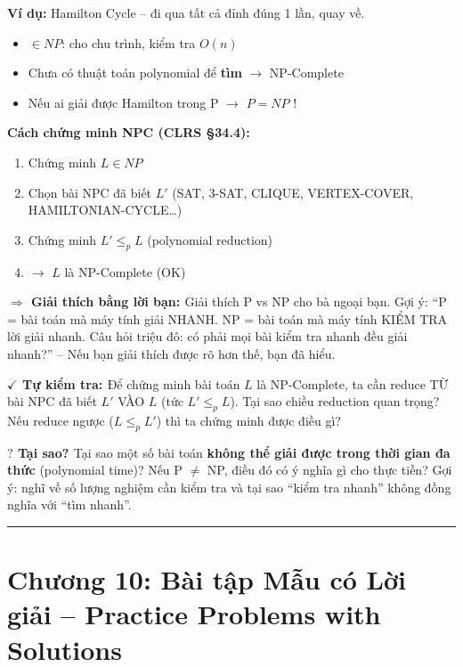 \documentclass[10pt]{article}
\newcommand{\whyprompt}[1]{%
  \begin{tcolorbox}[colback=yellow!8!white, colframe=orange!70!yellow, leftrule=3pt,
    toprule=0pt, bottomrule=0pt, rightrule=0pt,
    boxsep=2pt, left=6pt, right=6pt, top=4pt, bottom=4pt]
  {\small\textbf{\textcolor{orange!80!black}{$\boldsymbol{?}$ Tại sao? }} #1}
  \end{tcolorbox}}
\newcommand{\feynman}[1]{%
  \begin{tcolorbox}[colback=violet!5!white, colframe=violet!60!white, leftrule=3pt,
    toprule=0pt, bottomrule=0pt, rightrule=0pt,
    boxsep=2pt, left=6pt, right=6pt, top=4pt, bottom=4pt]
  {\small\textbf{\textcolor{violet!80!black}{$\Rightarrow$ Giải thích bằng lời bạn: }} #1}
  \end{tcolorbox}}
\newcommand{\checkpoint}[1]{%
  \begin{tcolorbox}[colback=orange!5!white, colframe=orange!70!black, leftrule=3pt,
    toprule=0pt, bottomrule=0pt, rightrule=0pt,
    boxsep=2pt, left=6pt, right=6pt, top=4pt, bottom=4pt]
  {\small\textbf{\textcolor{orange!80!black}{$\checkmark$ Tự kiểm tra: }} #1}
  \end{tcolorbox}}
\providecommand{\tightlist}{\setlength{\itemsep}{0pt}\setlength{\parskip}{0pt}}
\begin{document}
\textbf{Ví dụ:} Hamilton Cycle -- đi qua tất cả đỉnh đúng 1 lần, quay
về.

\begin{itemize}
\tightlist
\item
  \(\in NP\): cho chu trình, kiểm tra \(O(n)\)
\item
  Chưa có thuật toán polynomial để \textbf{tìm} \(\to\) NP-Complete
\item
  Nếu ai giải được Hamilton trong P \(\to\) \(P = NP\) !
\end{itemize}

\textbf{Cách chứng minh NPC (CLRS \S 34.4):}

\begin{enumerate}
\def\labelenumi{\arabic{enumi}.}
\tightlist
\item
  Chứng minh \(L \in NP\)
\item
  Chọn bài NPC đã biết \(L'\) (SAT, 3-SAT, CLIQUE, VERTEX-COVER,
  HAMILTONIAN-CYCLE\ldots)
\item
  Chứng minh \(L' \leq_p L\) (polynomial reduction)
\item
  \(\to\) \(L\) là NP-Complete (OK)
\end{enumerate}

\feynman{Giải thích P vs NP cho bà ngoại bạn. Gợi ý: ``P = bài toán mà máy tính giải NHANH. NP = bài toán mà máy tính KIỂM TRA lời giải nhanh. Câu hỏi triệu đô: có phải mọi bài kiểm tra nhanh đều giải nhanh?'' -- Nếu bạn giải thích được rõ hơn thế, bạn đã hiểu.}

\checkpoint{Để chứng minh bài toán $L$ là NP-Complete, ta cần reduce TỪ bài NPC đã biết $L'$ VÀO $L$ (tức $L' \leq_p L$). Tại sao chiều reduction quan trọng? Nếu reduce ngược ($L \leq_p L'$) thì ta chứng minh được điều gì?}

\whyprompt{Tại sao một số bài toán \textbf{không thể giải được trong thời gian đa thức} (polynomial time)? Nếu P $\neq$ NP, điều đó có ý nghĩa gì cho thực tiễn? Gợi ý: nghĩ về số lượng nghiệm cần kiểm tra và tại sao ``kiểm tra nhanh'' không đồng nghĩa với ``tìm nhanh''.}

\begin{center}\rule{0.5\linewidth}{0.5pt}\end{center}

\newpage
\section{Chương 10: Bài tập Mẫu có Lời giải -- Practice Problems with Solutions}\label{bai-tap-mau}
\end{document}
